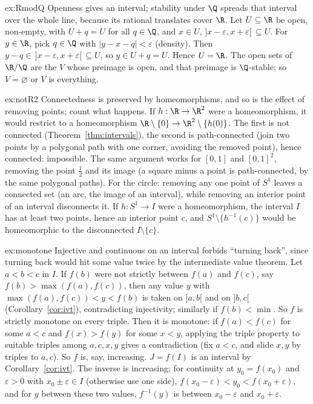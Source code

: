 \begin{solution}{ex:RmodQ}
\idea Openness gives an interval; stability under $\Q$ spreads that interval over the whole line, because its rational translates
cover $\R$.
\writeup Let $U\subseteq\R$ be open, non-empty, with $U+q=U$ for all $q\in\Q$, and $x\in U$, $]x-\varepsilon,x+\varepsilon[\,\subseteq U$. For $y\in\R$, pick $q\in\Q$ with $|y-x-q|<\varepsilon$
(density). Then $y-q\in\,]x-\varepsilon,x+\varepsilon[\,\subseteq U$, so $y\in U+q=U$. Hence $U=\R$. The open sets of $\R/\Q$ are the $V$ whose preimage is open, and that preimage
is $\Q$-stable; so $V=\varnothing$ or $V$ is everything.
\end{solution}

\begin{solution}{ex:notR2}
\idea Connectedness is preserved by homeomorphisms, and so is the effect of removing points; count what happens.
\writeup If $h:\R\to\R^2$ were a homeomorphism, it would restrict to a homeomorphism $\R\setminus\{0\}\to\R^2\setminus\{h(0)\}$. The first is not connected (Theorem~\ref{thm:intervals}),
the second is path-connected (join two points by a polygonal path with one corner, avoiding the removed point), hence connected:
impossible. The same argument works for $[0,1]$ and $[0,1]^2$, removing the point $\frac12$ and its image (a square minus a point is path-connected,
by the same polygonal paths). For the circle: removing any one point of $S^1$ leaves a connected set (an arc, the image of an interval),
while removing an interior point of an interval disconnects it. If $h:S^1\to I$ were a homeomorphism, the interval $I$ has at least two points,
hence an interior point $c$, and $S^1\setminus\{h^{-1}(c)\}$ would be homeomorphic to the disconnected $I\setminus\{c\}$.
\end{solution}

\begin{solution}{ex:monotone}
\idea Injective and continuous on an interval forbids ``turning back'', since turning back would hit some value twice by the intermediate
value theorem.
\writeup Let $a<b<c$ in $I$. If $f(b)$ were not strictly between $f(a)$ and $f(c)$, say $f(b)>\max(f(a),f(c))$, then any value $y$ with $\max(f(a),f(c))<y<f(b)$ is taken
on $]a,b[$ and on $]b,c[$ (Corollary~\ref{cor:ivt}), contradicting injectivity; similarly if $f(b)<\min$. So $f$ is strictly monotone on every triple. Then it is
monotone: if $f(a)<f(c)$ for some $a<c$ and $f(x)>f(y)$ for some $x<y$, applying the triple property to suitable triples among $a,c,x,y$
gives a contradiction (fix $a<c$, and slide $x,y$ by triples to $a,c$). So $f$ is, say, increasing. $J=f(I)$ is an interval by Corollary~\ref{cor:ivt}. The inverse
is increasing; for continuity at $y_0=f(x_0)$ and $\varepsilon>0$ with $x_0\pm\varepsilon\in I$ (otherwise use one side), $f(x_0-\varepsilon)<y_0<f(x_0+\varepsilon)$, and for $y$ between these two
values, $f^{-1}(y)$ is between $x_0-\varepsilon$ and $x_0+\varepsilon$.
\end{solution}

